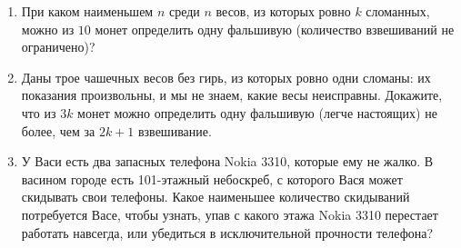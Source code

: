 \documentclass{article}
\begin{document}
\begin{enumerate}[label*=\protect\fbox{\arabic{enumi}}]
(a) Докажите, что из $3^k$ монет нельзя гарантированно определить фальшивую монету за $k$ взвешиваний.

(b) Докажите, что из $3^k$ монет нельзя гарантированно определить фальшивую монету за $k + 1$ взвешиваний.

\item При каком наименьшем $n$ среди $n$ весов, из которых ровно $k$ сломанных, можно из $10$ монет определить одну фальшивую (количество взвешиваний не ограничено)?

\item Даны трое чашечных весов без гирь, из которых ровно одни сломаны: их показания произвольны, и мы не знаем, какие весы неисправны. Докажите, что из $3k$ монет можно определить одну фальшивую (легче настоящих) не более, чем за $2k + 1$ взвешивание.

\item У Васи есть два запасных телефона Nokia 3310, которые ему не жалко. В васином городе есть 101-этажный небоскреб, с которого Вася может скидывать свои телефоны. Какое наименьшее количество скидываний потребуется Васе, чтобы узнать, упав с какого этажа Nokia 3310 перестает работать навсегда, или убедиться в исключительной прочности телефона?



	
	

\end{enumerate}
\end{document}
